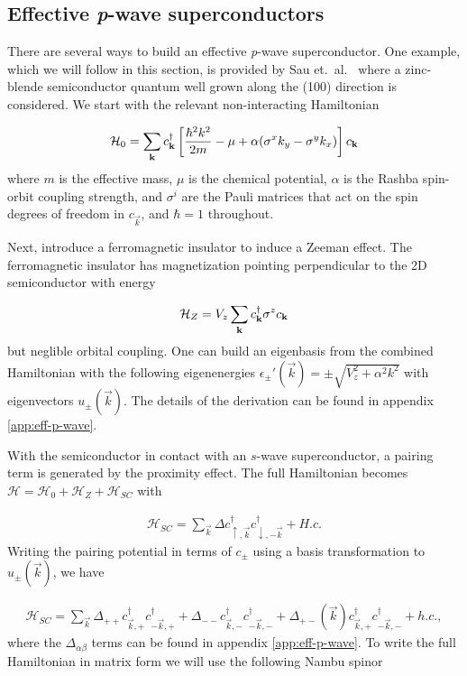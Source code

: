 \subsection{Effective \textit{p}-wave superconductors}
There are several ways to build an effective \textit{p}-wave superconductor.
One example, which we will follow in this section, is provided by Sau et.\ al.~\cite{sauGenericNewPlatform2010} where a zinc-blende semiconductor quantum well grown along the (100) direction is considered.
We start with the relevant non-interacting Hamiltonian

\begin{equation}
  \mathcal{H}_0 = \sum_{\mathbf{k}}  c^{\dagger}_{\mathbf{k}} \left[\frac{\hbar^2 k^2}{2m} - \mu + \alpha ( \sigma^x k_y - \sigma^y k_x) \right] c_{\mathbf{k}}
\end{equation}
where $m$ is the effective mass, $\mu$ is the chemical potential, $\alpha$ is the Rashba spin-orbit coupling strength, and $\sigma^i$ are the Pauli matrices that act on the spin degrees of freedom in $c_{\vec{k}}$, and $\hbar=1$ throughout.

Next, introduce a ferromagnetic insulator to induce a Zeeman effect.
The ferromagnetic insulator has magnetization pointing perpendicular to the 2D semiconductor with energy

\begin{equation}
  \mathcal{H}_Z = V_z \sum_{\mathbf{k}} c^{\dagger}_{\mathbf{k}} \sigma^z c_{\mathbf{k}}
\end{equation}
but neglible orbital coupling.
One can build an eigenbasis from the combined Hamiltonian with the following eigenenergies $\epsilon_{\pm}'(\vec{k}) = \pm \sqrt{V_z^2+\alpha^2 k^2}$ with eigenvectors $u_{\pm}(\vec{k})$. The details of the derivation can be found in appendix \ref{app:eff-p-wave}.

With the semiconductor in contact with an $s$-wave superconductor, a pairing term is generated by the proximity effect.
The full Hamiltonian becomes $\mathcal{H} = \mathcal{H}_0 + \mathcal{H}_Z + \mathcal{H}_{SC}$ with

\begin{align}
  \mathcal{H}_{SC} = \sum_{\vec{k}} \Delta c_{\uparrow,\vec{k}}^\dagger c_{\downarrow,-\vec{k}}^\dagger + H.c.
\end{align}
Writing the pairing potential in terms of $c_{\pm}$ using a basis transformation to $u_{\pm}(\vec{k})$, we have

\begin{align}
  \mathcal{H}_{SC} = \sum_{\vec{k}} \Delta_{++}c_{\vec{k},+}^{\dagger}c_{-\vec{k},+}^{\dagger} + \Delta_{- -}c_{\vec{k},-}^{\dagger}c_{-\vec{k},-}^{\dagger} +\Delta_{+-}(\vec{k})c_{\vec{k},+}^{\dagger}c_{-\vec{k},-}^{\dagger} + h.c.,
\end{align}
where the $\Delta_{\alpha \beta}$ terms can be found in appendix \ref{app:eff-p-wave}.
To write the full Hamiltonian in matrix form we will use the following Nambu spinor

